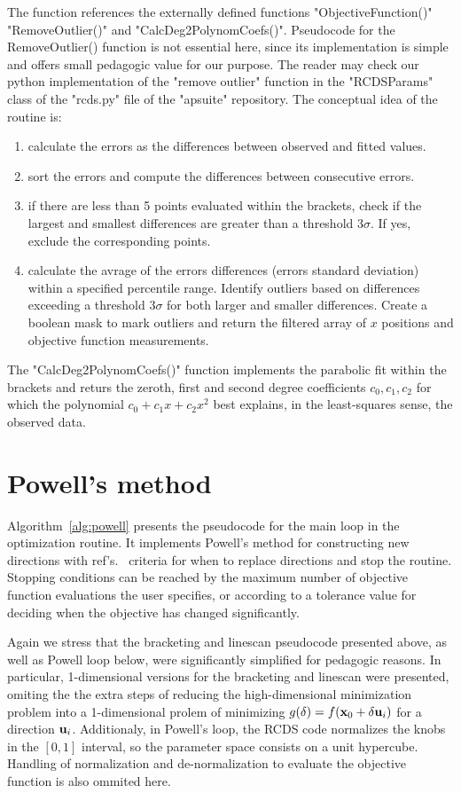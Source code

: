 The function references the externally defined functions "ObjectiveFunction()" "RemoveOutlier()" and "CalcDeg2PolynomCoefs()". Pseudocode for the RemoveOutlier() function is not essential here, since its implementation is simple and offers small pedagogic value for our purpose. The reader may check our python implementation of  the "remove outlier" function in the "RCDSParams" class of the "rcds.py" file of the "apsuite" repository. The conceptual idea of the routine is:
\begin{enumerate}
    \item calculate the errors as the differences between observed and fitted values.
    \item sort the errors and compute the differences between consecutive errors.
    \item if there are less than 5 points evaluated within the brackets, check if the largest and smallest differences are greater than a threshold $3\sigma$. If yes, exclude the corresponding points.
    \item calculate the avrage of the errors differences (errors standard deviation) within a specified percentile range. Identify outliers based on differences exceeding a threshold $3\sigma$ for both larger and smaller differences. Create a boolean mask to mark outliers and return the filtered array of $x$ positions and objective function measurements.
\end{enumerate}

The "CalcDeg2PolynomCoefs()" function implements the parabolic fit within the brackets and returs the zeroth, first and second degree coefficients $c_0, c_1, c_2$ for which the polynomial $c_0 + c_1x + c_2 x^2$ best explains, in the least-squares sense, the observed data.

\section{Powell's method}
Algorithm~\ref{alg:powell} presents the pseudocode for the main loop in the optimization routine. It implements Powell's method for constructing new directions with ref's.~\cite[section 10.7]{press_numerical_2007} criteria for when to replace directions and stop the routine. Stopping conditions can be reached by the maximum number of objective function evaluations the user specifies, or according to a tolerance value for deciding when the objective has changed significantly.

Again we stress that the bracketing and linescan pseudocode presented above, as well as Powell loop below, were significantly simplified for pedagogic reasons. In particular, 1-dimensional versions for the bracketing and linescan were presented, omiting the the extra steps of reducing the high-dimensional minimization problem into a 1-dimensional prolem of minimizing $g(\delta) = f(\vb{x}_0 + \delta \vb{u}_i)$ for a direction $\vb{u}_i$. Additionaly, in Powell's loop, the RCDS code normalizes the knobs in the $[0, 1]$ interval, so the parameter space consists on a unit hypercube. Handling of normalization and de-normalization to evaluate the objective function is also ommited here.

